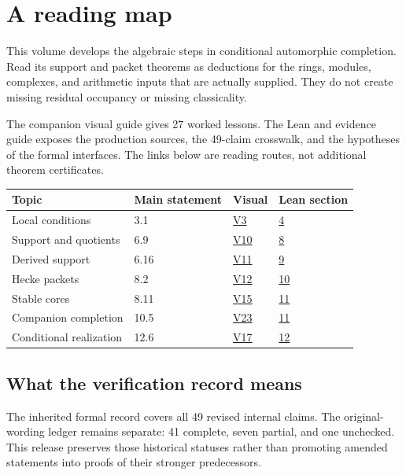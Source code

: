 \section*{A reading map}
This volume develops the algebraic steps in conditional automorphic completion. Read its support and packet theorems as deductions for the rings, modules, complexes, and arithmetic inputs that are actually supplied. They do not create missing residual occupancy or missing classicality.

The companion visual guide gives 27 worked lessons. The Lean and evidence guide exposes the production sources, the 49-claim crosswalk, and the hypotheses of the formal interfaces. The links below are reading routes, not additional theorem certificates.

\begin{center}\begin{tabular}{>{\raggedright\arraybackslash}p{.30\linewidth}lll}\toprule
Topic & Main statement & Visual & Lean section\\\midrule
Local conditions & 3.1 & \href{p12-route:main-v-3}{V3} & \href{p12-route:main-l-3.1}{4}\\
Support and quotients & 6.9 & \href{p12-route:main-v-10}{V10} & \href{p12-route:main-l-6.9}{8}\\
Derived support & 6.16 & \href{p12-route:main-v-11}{V11} & \href{p12-route:main-l-6.16}{9}\\
Hecke packets & 8.2 & \href{p12-route:main-v-12}{V12} & \href{p12-route:main-l-8.2}{10}\\
Stable cores & 8.11 & \href{p12-route:main-v-15}{V15} & \href{p12-route:main-l-8.11}{11}\\
Companion completion & 10.5 & \href{p12-route:main-v-23}{V23} & \href{p12-route:main-l-10.5}{11}\\
Conditional realization & 12.6 & \href{p12-route:main-v-17}{V17} & \href{p12-route:main-l-12.6}{12}\\
\bottomrule\end{tabular}\end{center}
\subsection*{What the verification record means}
The inherited formal record covers all 49 revised internal claims. The original-wording ledger remains separate: 41 complete, seven partial, and one unchecked. This release preserves those historical statuses rather than promoting amended statements into proofs of their stronger predecessors.


